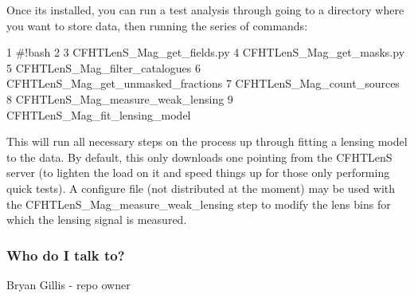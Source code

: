 Once it\textquotesingle{}s installed, you can run a test analysis through going to a directory where you want to store data, then running the series of commands\+:


\begin{DoxyCode}
1 #!bash
2 
3 CFHTLenS\_Mag\_get\_fields.py
4 CFHTLenS\_Mag\_get\_masks.py
5 CFHTLenS\_Mag\_filter\_catalogues
6 CFHTLenS\_Mag\_get\_unmasked\_fractions
7 CFHTLenS\_Mag\_count\_sources
8 CFHTLenS\_Mag\_measure\_weak\_lensing
9 CFHTLenS\_Mag\_fit\_lensing\_model
\end{DoxyCode}


This will run all necessary steps on the process up through fitting a lensing model to the data. By default, this only downloads one pointing from the C\+F\+H\+T\+Len\+S server (to lighten the load on it and speed things up for those only performing quick tests). A configure file (not distributed at the moment) may be used with the C\+F\+H\+T\+Len\+S\+\_\+\+Mag\+\_\+measure\+\_\+weak\+\_\+lensing step to modify the lens bins for which the lensing signal is measured.

\subsubsection*{Who do I talk to?}


\begin{DoxyItemize}
\item Bryan Gillis -\/ repo owner 
\end{DoxyItemize}